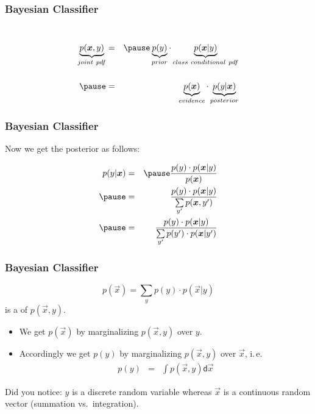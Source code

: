 \begin{frame}
	\frametitle{Bayesian Classifier \cont}

	\\[.5cm]

	\begin{eqnarray*}
		\underbrace{p(\vec x , y)}_{joint\ pdf}
		&=& \pause \underbrace{p(y)}_{prior} \cdot \underbrace{p(\vec x | y)}_{class\ conditional\ pdf} \\[.5cm] \pause
		&=& \underbrace{ p(\vec x)}_{evidence} \cdot \underbrace{ p(y| \vec x)}_{posterior}
	\end{eqnarray*}
\end{frame}


\begin{frame}
	\frametitle{Bayesian Classifier \cont}

	Now we get the posterior as follows:

	\begin{eqnarray*}
		p(y| \vec x)
		&=& \pause \frac{p(y) \cdot p(\vec x | y)}{p(\vec x)} \\ \pause
		&=& \frac{p(y) \cdot p(\vec x | y)}{\sum\limits_{y'}p(\vec x , y')} \\ \pause
		&=& \frac{p(y) \cdot p(\vec x | y)}{\sum\limits_{y'}p(y') \cdot p(\vec x | y')}\\
	\end{eqnarray*}
\end{frame}


\begin{frame}
	\frametitle{Bayesian Classifier \cont}

	\begin{displaymath}
		p(\vec x) = \sum\limits_{y}p(y) \cdot p(\vec x | y)
	\end{displaymath}
	is a  of $p(\vec x , y)$.

	\begin{itemize}
		\item We get $p(\vec{x})$ by marginalizing $p(\vec{x}, y)$ over $y$.
		\item Accordingly we get $p(y)$ by marginalizing $p(\vec{x}, y)$ over $\vec{x}$, i.\,e.
		      \begin{eqnarray*}
			      p(y)&=& \int p(\vec{x}, y) \mathsf{d}\vec{x}
		      \end{eqnarray*}
	\end{itemize}

	\alert{Did you notice:} $y$ is a discrete random variable whereas $\vec{x}$ is a continuous random vector (summation vs.\ integration).
\end{frame}


